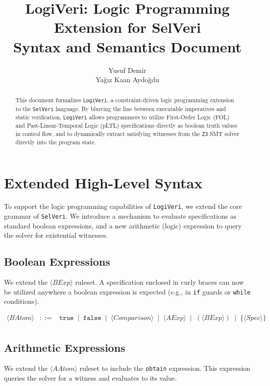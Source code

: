 \documentclass{article}
\title{LogiVeri: Logic Programming Extension for SelVeri \\ Syntax and Semantics Document}
\author{Yusuf Demir \\ Yağız Kaan Aydoğdu}
\begin{document}
\maketitle

\begin{abstract}
This document formalizes \texttt{LogiVeri}, a constraint-driven logic programming extension to the \texttt{SelVeri} language. By blurring the line between executable imperatives and static verification, \texttt{LogiVeri} allows programmers to utilize First-Order Logic (FOL) and Past-Linear-Temporal Logic (pLTL) specifications directly as boolean truth values in control flow, and to dynamically extract satisfying witnesses from the \texttt{Z3} SMT solver directly into the program state.
\end{abstract}

\newpage
\section{Extended High-Level Syntax}

To support the logic programming capabilities of \texttt{LogiVeri}, we extend the core grammar of \texttt{SelVeri}. We introduce a mechanism to evaluate specifications as standard boolean expressions, and a new arithmetic (logic) expression to query the solver for existential witnesses.

\subsection{Boolean Expressions}
We extend the $\langle \mathit{BExp} \rangle$ ruleset. A specification enclosed in curly braces can now be utilized anywhere a boolean expression is expected (e.g., in \texttt{if} guards or \texttt{while} conditions).

\[
\begin{array}{rcl}
\langle \mathit{BAtom} \rangle
&::=&
\mathtt{true}
\;\mid\;
\mathtt{false}
\;\mid\;
\langle \mathit{Comparison} \rangle
\;\mid\;
\langle \mathit{AExp} \rangle 
\;\mid\;
(\langle \mathit{BExp} \rangle)
\;\mid\;
\textbf{\{} \langle \mathit{Spec} \rangle \textbf{\}} \\[4pt]
\end{array}
\]

\subsection{Arithmetic Expressions}
We extend the $\langle \mathit{AAtom} \rangle$ ruleset to include the \texttt{obtain} expression. This expression queries the solver for a witness and evaluates to its value.
\end{document}

